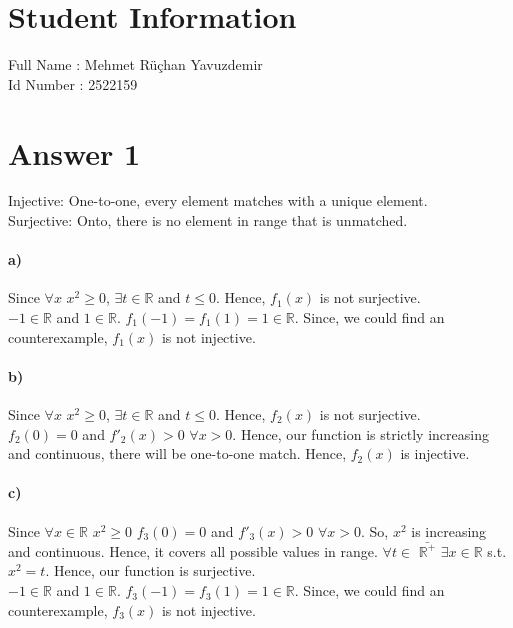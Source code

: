 \documentclass[12pt]{article}
\begin{document}
\section*{Student Information }
Full Name : Mehmet Rüçhan Yavuzdemir \\
Id Number : 2522159 \\

\section*{Answer 1}

Injective: One-to-one, every element matches with a unique element.\\
Surjective: Onto, there is no element in range that is unmatched.

\paragraph{a)} Since $\forall x$  $x^2 \geq 0$, $\exists t \in \mathbb{R}$ and $t \leq 0$. Hence, $f_1(x)$ is not surjective.\\

$-1 \in \mathbb{R}$ and $1 \in \mathbb{R}$. $f_1(-1) = f_1(1) = 1 \in \mathbb{R}$. Since, we could find an counterexample, $f_1(x)$ is not injective.\\

\paragraph{b)} Since $\forall x$  $x^2 \geq 0$, $\exists t \in \mathbb{R}$ and $t \leq 0$. Hence, $f_2(x)$ is not surjective.\\

$f_2(0) = 0$ and $f'_2(x) > 0$ $\forall x > 0$. Hence, our function is strictly increasing and continuous, there will be one-to-one match. Hence, $f_2(x)$ is injective.\\ 

\paragraph{c)} Since $\forall x \in \mathbb{R}$ $x^2 \geq 0$ $f_3(0) = 0$ and $f'_3(x) > 0$ $\forall x > 0$. So, $x^2$ is increasing and continuous. Hence, it covers all possible values in range.  $\forall t\in $ $\bar{\mathbb{R}^+}$ $\exists x \in \mathbb{R}$ s.t.  $x^2 = t$. Hence, our function is surjective. \\

$-1 \in \mathbb{R}$ and $1 \in \mathbb{R}$. $f_3(-1) = f_3(1) = 1 \in \mathbb{R}$. Since, we could find an counterexample, $f_3(x)$ is not injective.\\
\end{document}
